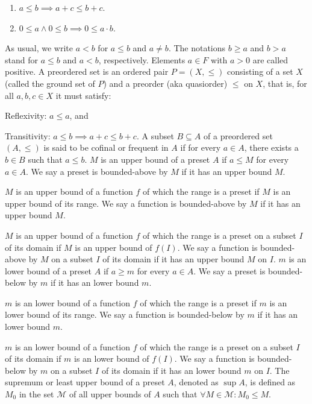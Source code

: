 \documentclass[a4paper,12pt]{article}
\begin{document}
\begin{enumerate}
\item $a\leq b\implies a+c\leq b+c$.
\item $0\leq a\land 0\leq b\implies 0\leq a\cdot b$.
\end{enumerate}
As usual, we write $a<b$ for $a\leq b$ and $a\neq b$. The notations $b\geq a$ and $b>a$ stand for $a\leq b$ and $a<b$, respectively. Elements $a\in F$ with $a>0$ are called positive.
A preordered set is an ordered pair $P=(X,\leq )$ consisting of a set $X$ (called the ground set of $P$) and a preorder (aka quasiorder) $\leq$ on $X$, that is, for all $a,b,c\in X$ it must satisfy:
\bit
\item Reflexivity: $a\leq a$, and
\item Transitivity: $a\leq b\implies a+c\leq b+c$.
\eit
{}
A subset $B\subseteq A$ of a preordered set $(A,\leq )$ is said to be cofinal or frequent in $A$ if for every $a\in A$, there exists a $b\in B$ such that $a\leq b$.
$M$ is an upper bound of a preset $A$ if $a\leq M$ for every $a\in A$. We say a preset is bounded-above by $M$ if it has an upper bound $M$.

$M$ is an upper bound of a function $f$ of which the range is a preset if $M$ is an upper bound of its range. We say a function is bounded-above by $M$ if it has an upper bound $M$.

$M$ is an upper bound of a function $f$ of which the range is a preset on a subset $I$ of its domain if $M$ is an upper bound of $f(I)$. We say a function is bounded-above by $M$ on a subset $I$ of its domain if it has an upper bound $M$ on $I$.
$m$ is an lower bound of a preset $A$ if $a\geq m$ for every $a\in A$. We say a preset is bounded-below by $m$ if it has an lower bound $m$.

$m$ is an lower bound of a function $f$ of which the range is a preset if $m$ is an lower bound of its range. We say a function is bounded-below by $m$ if it has an lower bound $m$.

$m$ is an lower bound of a function $f$ of which the range is a preset on a subset $I$ of its domain if $m$ is an lower bound of $f(I)$. We say a function is bounded-below by $m$ on a subset $I$ of its domain if it has an lower bound $m$ on $I$.
The supremum or least upper bound of a preset $A$, denoted as $\sup A$, is defined as $M_0$ in the set $\mathcal{M}$ of all upper bounds of $A$ such that $\forall M\in\mathcal{M}\colon M_0\leq M$.
\end{document}
